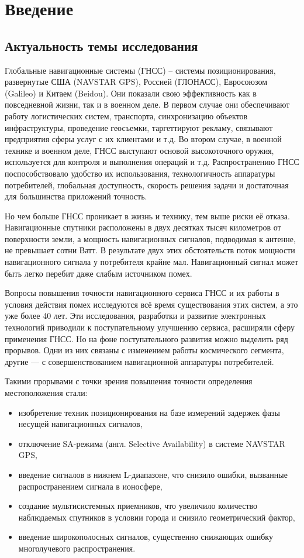 \chapter*{Введение}

\section*{Актуальность темы исследования}

Глобальные навигационные системы (ГНСС) -- системы позиционирования, развернутые США (NAVSTAR GPS), Россией (ГЛОНАСС), Евросоюзом (Galileo) и Китаем (Beidou). 
Они показали свою эффективность как в повседневной жизни, так и в военном деле. 
В первом случае они обеспечивают работу логистических систем, транспорта, синхронизацию объектов инфраструктуры, проведение геосъемки, таргеттируют рекламу, связывают предприятия сферы услуг с их клиентами и т.д.
Во втором случае, в военной технике и военном деле, ГНСС выступают основой высокоточного оружия, используется для контроля и выполнения операций и т.д. 
Распространению ГНСС поспособствовало удобство их использования, технологичность аппаратуры потребителей, глобальная доступность, скорость решения задачи и достаточная для большинства приложений точность. 

Но чем больше ГНСС проникает в жизнь и технику, тем выше риски её отказа. 
Навигационные спутники расположены в двух десятках тысяч километров от поверхности земли, а мощность навигационных сигналов, подводимая к антенне, не превышает сотни Ватт. 
В результате двух этих обстоятельств поток мощности навигационного сигнала у потребителя крайне мал. 
Навигационный сигнал может быть легко перебит даже слабым источником помех. 

Вопросы повышения точности навигационного сервиса ГНСС и их работы в условия действия помех исследуются всё время существования этих систем, а это уже более 40 лет. 
Эти исследования, разработки и развитие электронных технологий приводили к поступательному улучшению сервиса, расширяли сферу применения ГНСС. 
Но на фоне поступательного развития можно выделить ряд прорывов. 
Одни из них связаны с изменением работы космического сегмента, другие --- с совершенствованием навигационной аппаратуры потребителей. 

Такими прорывами с точки зрения повышения точности определения местоположения стали:
\begin{itemize}
\item изобретение техник позиционирования на базе измерений задержек фазы несущей навигационных сигналов,
\item отключение SA-режима (англ. Selective Availability) в системе NAVSTAR GPS,
\item введение сигналов в нижнем L-диапазоне, что снизило ошибки, вызванные распространением сигнала в ионосфере,
\item создание мультисистемных приемников, что увеличило количество наблюдаемых спутников в условии города и снизило геометрический фактор, 
\item введение широкополосных сигналов, существенно снижающих ошибку многолучевого распространения.
\end{itemize}

